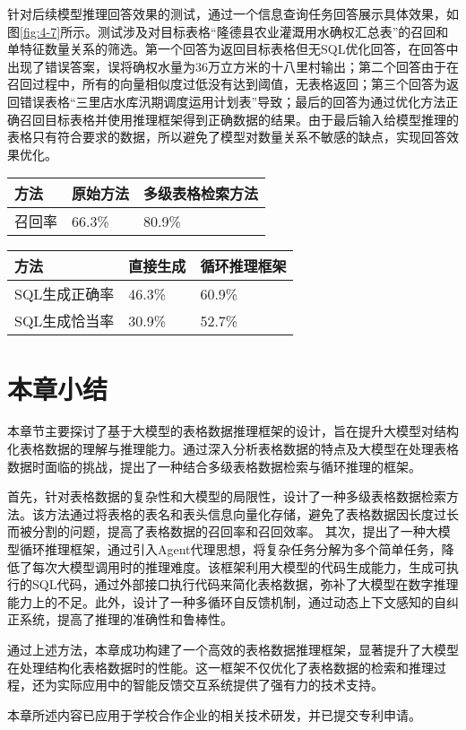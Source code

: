 针对后续模型推理回答效果的测试，通过一个信息查询任务回答展示具体效果，如图\ref{fig:4-7}所示。测试涉及对目标表格“隆德县农业灌溉用水确权汇总表”的召回和单特征数量关系的筛选。第一个回答为返回目标表格但无SQL优化回答，在回答中出现了错误答案，误将确权水量为36万立方米的十八里村输出；第二个回答由于在召回过程中，所有的向量相似度过低没有达到阈值，无表格返回；第三个回答为返回错误表格“三里店水库汛期调度运用计划表”导致；最后的回答为通过优化方法正确召回目标表格并使用推理框架得到正确数据的结果。由于最后输入给模型推理的表格只有符合要求的数据，所以避免了模型对数量关系不敏感的缺点，实现回答效果优化。
\begin{table}[h]
    \centering
    \label{tab:table-retrival-results}
    \begin{tabularx}{\linewidth}{XXX}
        \toprule[1.5pt]
        {方法} & {原始方法} & {多级表格检索方法} \\
        \midrule[1pt]
        {召回率} & 66.3\% & 80.9\% \\
        \bottomrule[1.5pt]
    \end{tabularx}
\end{table}
\begin{table}[h]
    \centering
    \label{tab:SQL-Generation-results}
    \begin{tabularx}{\linewidth}{XXX}
        \toprule[1.5pt]
        {方法} & {直接生成} & {循环推理框架} \\
        \midrule[1pt]
        {SQL生成正确率} & 46.3\% & 60.9\% \\
        {SQL生成恰当率} & 30.9\% & 52.7\% \\
        \bottomrule[1.5pt]
    \end{tabularx}
\end{table}
\section{本章小结}
本章节主要探讨了基于大模型的表格数据推理框架的设计，旨在提升大模型对结构化表格数据的理解与推理能力。通过深入分析表格数据的特点及大模型在处理表格数据时面临的挑战，提出了一种结合多级表格数据检索与循环推理的框架。

首先，针对表格数据的复杂性和大模型的局限性，设计了一种多级表格数据检索方法。该方法通过将表格的表名和表头信息向量化存储，避免了表格数据因长度过长而被分割的问题，提高了表格数据的召回率和召回效率。
其次，提出了一种大模型循环推理框架，通过引入Agent代理思想，将复杂任务分解为多个简单任务，降低了每次大模型调用时的推理难度。该框架利用大模型的代码生成能力，生成可执行的SQL代码，通过外部接口执行代码来简化表格数据，弥补了大模型在数字推理能力上的不足。此外，设计了一种多循环自反馈机制，通过动态上下文感知的自纠正系统，提高了推理的准确性和鲁棒性。

通过上述方法，本章成功构建了一个高效的表格数据推理框架，显著提升了大模型在处理结构化表格数据时的性能。这一框架不仅优化了表格数据的检索和推理过程，还为实际应用中的智能反馈交互系统提供了强有力的技术支持。

本章所述内容已应用于学校合作企业的相关技术研发，并已提交专利申请。
